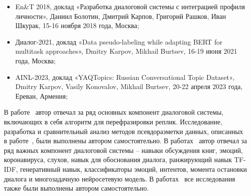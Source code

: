 {\probation}
\begin{itemize}
   \item En\&T 2018, доклад «Разработка диалоговой системы с интеграцией профиля личности», Даниил Болотин, Дмитрий Карпов, Григорий Рашков, Иван Шкурак, 15-16 ноября 2018 года, Москва;
   \item Диалог-2021, доклад «Data pseudo-labeling while adapting BERT for multitask approaches», Dmitry Karpov, Mikhail Burtsev, 16-19 июня 2021 года, Москва;
   \item AINL-2023, доклад «YAQTopics: Russian Conversational Topic Dataset», Dmitry Karpov, Vasily Konovalov, Mikhail Burtsev, 20-22 апреля 2023 года, Ереван, Армения;
\end{itemize}%


{\contribution} В работе~\cite{Болотин_Карпов_Рашков_Шкурак_2019} автор отвечал за ряд основных компонент диалоговой системы, включающих в себя алгоритм для перефразировки реплик. Исследование, разработка и сравнительный анализ методов псевдоразметки данных, описанных в работе~\cite{pseudolabel}, были выполнены автором самостоятельно. В работах~\cite{dream1,dream1_trudy,dream2,mtldream} автор отвечал за ряд важных компонент диалоговой системы -- навыки обсуждения книг, эмоций, коронавируса, слухов, навык для обоснования диалога, ранжирующий навык TF-IDF, генеративный навык, классификаторы эмоций, интентов, момента остановки диалога и многозадачную нейросетевую модель. В работах~\cite{rumtl,rutopics} все исследования также были выполнены автором самостоятельно.

